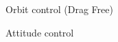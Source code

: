 \begin{section}{Orbit control (Drag Free)}

\end{section}
\begin{section}{Attitude control}

\end{section}